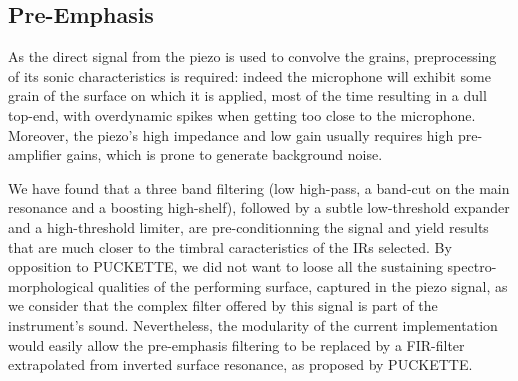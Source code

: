 \subsection{Pre-Emphasis}\label{sec:preemph}

As the direct signal from the piezo is used to convolve the grains, preprocessing of its sonic characteristics is required: indeed the microphone will exhibit some grain of the surface on which it is applied, most of the time resulting in a dull top-end, with overdynamic spikes when getting too close to the microphone. Moreover, the piezo's high impedance and low gain usually requires high pre-amplifier gains, which is prone to generate background noise. 

We have found that a three band filtering (low high-pass, a band-cut on the main resonance and a boosting high-shelf), followed by a subtle low-threshold expander and a high-threshold limiter, are pre-conditionning the signal and yield results that are much closer to the timbral caracteristics of the IRs selected. By opposition to PUCKETTE, we did not want to loose all the sustaining spectro-morphological qualities of the performing surface, captured in the piezo signal, as we consider that the complex filter offered by this signal is part of the instrument's sound. Nevertheless, the modularity of the current implementation would easily allow the pre-emphasis filtering to be replaced by a FIR-filter extrapolated from inverted surface resonance, as proposed by PUCKETTE.